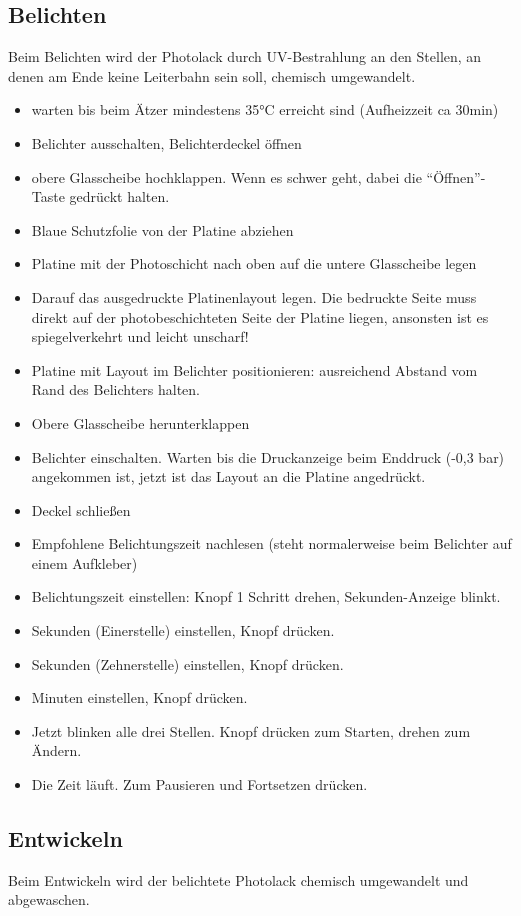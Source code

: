 \documentclass{\basedir/fablab-document}
\begin{document}
\subsection{Belichten}
\label{sec:belichten}
Beim Belichten wird der Photolack durch UV-Bestrahlung an den Stellen, an denen am Ende keine Leiterbahn sein soll, chemisch umgewandelt.

\begin{itemize}
\item warten bis beim Ätzer mindestens 35°C erreicht sind (Aufheizzeit ca 30min)
\item Belichter ausschalten, Belichterdeckel öffnen
\item obere Glasscheibe hochklappen. Wenn es schwer geht, dabei die \enquote{Öffnen}-Taste gedrückt halten.
\item Blaue Schutzfolie von der Platine abziehen
\item Platine mit der Photoschicht nach oben auf die untere Glasscheibe legen
\item Darauf das ausgedruckte Platinenlayout legen. Die bedruckte Seite muss direkt auf der photobeschichteten Seite der Platine liegen, ansonsten ist es spiegelverkehrt und leicht unscharf!
\item Platine mit Layout im Belichter positionieren: ausreichend Abstand vom Rand des Belichters halten.
\item Obere Glasscheibe herunterklappen
\item Belichter einschalten. Warten bis die Druckanzeige beim Enddruck (-0,3 bar) angekommen ist, jetzt ist das Layout an die Platine angedrückt.
\item Deckel schließen 
\item Empfohlene Belichtungszeit nachlesen (steht normalerweise beim Belichter auf einem Aufkleber)
\item Belichtungszeit einstellen: Knopf 1 Schritt drehen, Sekunden-Anzeige blinkt.
\item Sekunden (Einerstelle) einstellen, Knopf drücken.
\item Sekunden (Zehnerstelle) einstellen, Knopf drücken.
\item Minuten einstellen, Knopf drücken.
\item Jetzt blinken alle drei Stellen. Knopf drücken zum Starten, drehen zum Ändern.
\item Die Zeit läuft. Zum Pausieren und Fortsetzen drücken.
\end{itemize}


\subsection{Entwickeln}
\label{sec:entwickeln}
Beim Entwickeln wird der belichtete Photolack chemisch umgewandelt und abgewaschen.
\end{document}

